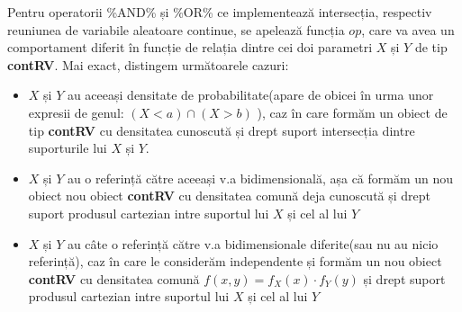 \documentclass[12pt]{article}
\begin{document}
Pentru operatorii \%AND\% și \%OR\% ce implementează intersecția, respectiv reuniunea de variabile aleatoare continue, se apelează funcția $op$, care va avea un comportament diferit în funcție de relația dintre cei doi parametri $X$ și $Y$ de tip \textbf{contRV}. Mai exact, distingem următoarele cazuri:
\begin{itemize}
\item $X$ și $Y$ au aceeași densitate de probabilitate(apare de obicei în urma unor expresii de genul: $(X < a) \cap (X > b)$ ), caz în care formăm un obiect de tip \textbf{contRV} cu densitatea cunoscută și drept suport intersecția dintre suporturile lui $X$ și $Y$.
\item $X$ și $Y$ au o referință către aceeași v.a bidimensională, așa că formăm un nou obiect nou obiect \textbf{contRV} cu densitatea comună deja cunoscută și drept suport produsul cartezian intre suportul lui $X$ și cel al lui $Y$
\item $X$ și $Y$ au câte o referință către v.a bidimensionale diferite(sau nu au nicio referință), caz în care le considerăm independente și formăm un nou obiect \textbf{contRV} cu densitatea comună $f(x, y) = f_X(x) \cdot f_Y(y)$ și drept suport produsul cartezian intre suportul lui $X$ și cel al lui $Y$		
\end{itemize}
\end{document}
